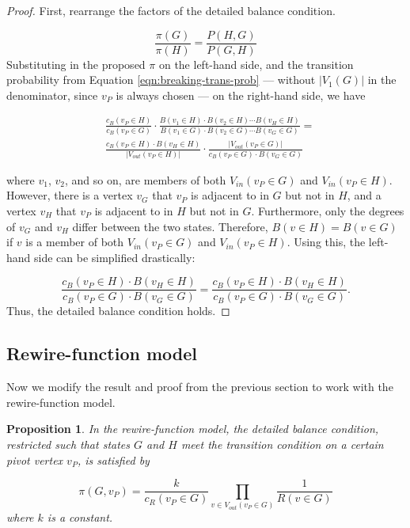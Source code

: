 \documentclass[a4paper,10pt]{article}
\newtheorem{prop}{Proposition}
\begin{document}
\begin{proof}
First, rearrange the factors of the detailed balance condition. 

\begin{equation}
 \frac{\pi(G)}{\pi(H)} = \frac{P(H, G)}{P(G, H)}
\end{equation}
Substituting in the proposed $\pi$ on the left-hand side, and the transition probability from Equation \ref{eqn:breaking-trans-prob} --- without $|V_1(G)|$ in the denominator, since $v_P$ is always chosen --- on the right-hand side, we have

\begin{equation}
\begin{split}
&\frac{c_B(v_P \in H)}{c_B(v_P \in G)} \cdot\frac{B(v_1 \in H) \cdot B(v_2 \in H) \cdots B(v_H \in H)}
{B(v_1 \in G) \cdot B(v_2 \in G) \cdots B(v_G \in G)} = \\
 &\frac{c_B(v_P \in H) \cdot B(v_H \in H)}{|V_{out}(v_P \in H)|} \cdot \frac{|V_{out}(v_P \in G)|}{c_B(v_P \in G) \cdot B(v_G \in G)} 
\end{split} 
\end{equation}

where $v_1$, $v_2$, and so on, are members of both $V_{in}(v_P \in G)$ and $V_{in}(v_P \in H)$. However, there is a vertex $v_G$ that $v_P$ is adjacent to in $G$ but not in $H$, and a vertex $v_H$ that $v_P$ is adjacent to in $H$ but not in $G$. Furthermore, only the degrees of $v_G$ and $v_H$ differ between the two states. Therefore, $B(v \in H) = B(v \in G)$ if $v$ is a member of both $V_{in}(v_P \in G)$ and $V_{in}(v_P \in H)$. Using this, the left-hand side can be simplified drastically:

\begin{equation}
 \frac{c_B(v_P \in H) \cdot B(v_H \in H)}{c_B(v_P \in G) \cdot B(v_G \in G)} = 
\frac{c_B(v_P \in H) \cdot B(v_H \in H)}{c_B(v_P \in G) \cdot B(v_G \in G)}.
\end{equation}
Thus, the detailed balance condition holds.

\end{proof}

\subsection{Rewire-function model}
Now we modify the result and proof from the previous section to work with the rewire-function model.

\begin{prop}
\label{prop:rewire-restricted}
 In the rewire-function model, the detailed balance condition, restricted such that states $G$ and $H$ meet the transition condition on a certain pivot vertex $v_P$, is satisfied by

 \begin{equation}
 \label{eqn:pi-k1-rewire}
  \pi(G, v_P) = \frac{k}{c_R(v_P \in G)} 
 \prod \limits_{v \in V_{out}(v_P \in G)} \frac{1}{R(v \in G)}
 \end{equation}
where $k$ is a constant.
\end{prop}
\end{document}
